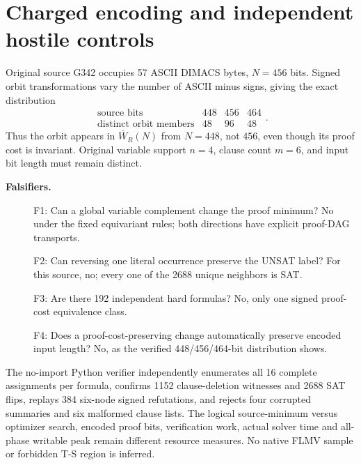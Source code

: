 \documentclass{article}
\begin{document}
\section*{Charged encoding and independent hostile controls}
Original source G342 occupies 57 ASCII DIMACS bytes, $N=456$ bits. Signed orbit transformations vary the number of ASCII minus signs, giving the exact distribution
\[
\begin{array}{c|rrr}
\text{source bits}&448&456&464\\\hline
\text{distinct orbit members}&48&96&48
\end{array}.
\]
Thus the orbit appears in $\overline W_R(N)$ from $N=448$, not $456$, even though its proof cost is invariant. Original variable support $n=4$, clause count $m=6$, and input bit length must remain distinct.

\noindent\textbf{Falsifiers.}
\begin{description}
\item[] F1: Can a global variable complement change the proof minimum? No under the fixed equivariant rules; both directions have explicit proof-DAG transports.
\item[] F2: Can reversing one literal occurrence preserve the UNSAT label? For this source, no; every one of the 2688 unique neighbors is SAT.
\item[] F3: Are there 192 independent hard formulas? No, only one signed proof-cost equivalence class.
\item[] F4: Does a proof-cost-preserving change automatically preserve encoded input length? No, as the verified 448/456/464-bit distribution shows.
\end{description}
The no-import Python verifier independently enumerates all 16 complete assignments per formula, confirms 1152 clause-deletion witnesses and 2688 SAT flips, replays 384 six-node signed refutations, and rejects four corrupted summaries and six malformed clause lists. The logical source-minimum versus optimizer search, encoded proof bits, verification work, actual solver time and all-phase writable peak remain different resource measures. No native FLMV sample or forbidden T-S region is inferred.
\end{document}
